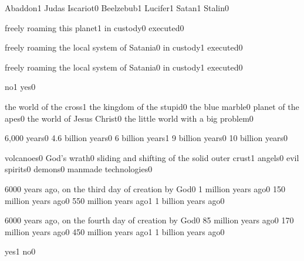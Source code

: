 {Abaddon}{1}
{Judas Iscariot}{0}
{Beelzebub}{1}
{Lucifer}{1}
{Satan}{1}
{Stalin}{0}
\qstop

{freely roaming this planet}{1}
{in custody}{0}
{executed}{0}
\qstop

{freely roaming the local system of Satania}{0}
{in custody}{1}
{executed}{0}
\qstop

{freely roaming the local system of Satania}{0}
{in custody}{1}
{executed}{0}
\qstop




{no}{1}
{yes}{0}
\qstop


{the world of the cross}{1}
{the kingdom of the stupid}{0}
{the blue marble}{0}
{planet of the apes}{0}
{the world of Jesus Christ}{0}
{the little world with a big problem}{0}
\qstop

{6,000 years}{0}
{4.6 billion years}{0}
{6 billion years}{1}
{9 billion years}{0}
{10 billion years}{0}
\qstop


{volcanoes}{0}
{God's wrath}{0}
{sliding and shifting of the solid outer crust}{1}
{angels}{0}
{evil spirits}{0}
{demons}{0}
{manmade technologies}{0}
\qstop

{6000 years ago, on the third day of creation by God}{0}
{1 million years ago}{0}
{150 million years ago}{0}
{550 million years ago}{1}
{1 billion years ago}{0}
\qstop

{6000 years ago, on the fourth day of creation by God}{0}
{85 million years ago}{0}
{170 million years ago}{0}
{450 million years ago}{1}
{1 billion years ago}{0}
\qstop

{yes}{1}
{no}{0}
\qstop


